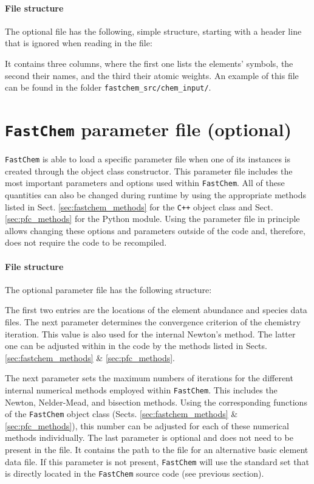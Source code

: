 \documentclass[numbers=noenddot]{fcmanual}
\newcommand{\fc}{\texttt{FastChem}\xspace}
\newcommand{\cpp}{\ttt{C++}\xspace}
\newcommand{\ttt}[1]{\texttt {#1}}
\begin{document}
\paragraph{File structure}
The optional file has the following, simple structure, starting with a header line that is ignored when reading in the file:

It contains three columns, where the first one lists the elements' symbols, the second their names, and the third their atomic weights. An example of this file can be found in the folder \texttt{fastchem\_src/chem\_input/}.


\section{\fc parameter file (optional)}
\label{sec:fc_parameter_file}
\fc is able to load a specific parameter file when one of its instances is created through the object class constructor. This parameter file includes the most important parameters and options used within \fc. All of these quantities can also be changed during runtime by using the appropriate methods listed in Sect. \ref{sec:fastchem_methods} for the \cpp object class and Sect. \ref{sec:pfc_methods} for the Python module. Using the parameter file in principle allows changing these options and parameters outside of the code and, therefore, does not require the code to be recompiled.

\paragraph{File structure}
The optional parameter file has the following structure:

The first two entries are the locations of the element abundance and species data files. The next parameter determines the convergence criterion of the chemistry iteration. This value is also used for the internal Newton's method. The latter one can be adjusted within in the code by the methods listed in Sects. \ref{sec:fastchem_methods} \& \ref{sec:pfc_methods}.

The next parameter sets the maximum numbers of iterations for the different internal numerical methods employed within \fc. This includes the Newton, Nelder-Mead, and bisection methods. Using the corresponding functions of the \fc object class (Sects. \ref{sec:fastchem_methods} \& \ref{sec:pfc_methods}), this number can be adjusted for each of these numerical methods individually. 
The last parameter is optional and does not need to be present in the file. It contains the path to the file for an alternative basic element data file. If this parameter is not present, \fc will use the standard set that is directly located in the \fc source code (see previous section).
\end{document}
